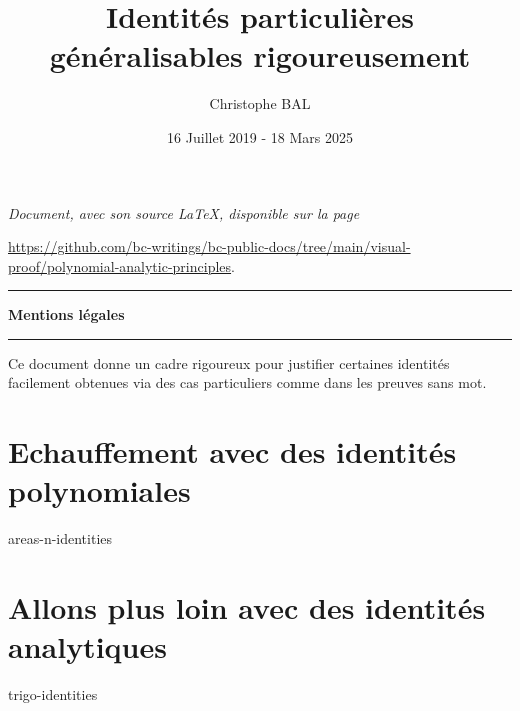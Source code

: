 \documentclass[12pt]{amsart}
\begin{document}
\title{Identités particulières généralisables rigoureusement}
\author{Christophe BAL}
\date{16 Juillet 2019 - 18 Mars 2025}

\maketitle

\begin{center}
	\itshape
	Document, avec son source \LaTeX, disponible sur la page

	\url{https://github.com/bc-writings/bc-public-docs/tree/main/visual-proof/polynomial-analytic-principles}.
\end{center}


\bigskip


\begin{center}
	\hrule\vspace{.3em}
	{
		\fontsize{1.35em}{1em}\selectfont
		\textbf{Mentions \og légales \fg}
	}

	\vspace{0.45em}
	\doclicenseThis
	\hrule
\end{center}


\bigskip


\setcounter{tocdepth}{1}
\tableofcontents



\newpage

\begin{meta-abstract*}
	Ce document donne un cadre rigoureux pour justifier certaines identités facilement obtenues via des cas particuliers  comme dans les preuves sans mot. 
\end{meta-abstract*}


\section{Echauffement avec des identités polynomiales}

{areas-n-identities}



\newpage

\section{Allons plus loin avec des identités analytiques}

{trigo-identities}
\end{document}
